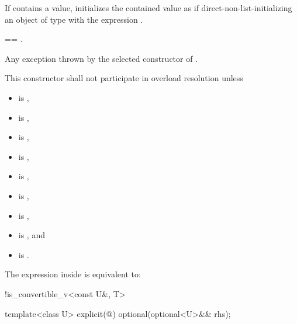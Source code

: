 \begin{itemdescr}
\pnum
\effects
If  contains a value,
initializes the contained value as if direct-non-list-initializing
an object of type  with the expression .

\pnum
\ensures
{} == .

\pnum
\throws
Any exception thrown by the selected constructor of .

\pnum
\remarks
This constructor shall not participate in overload resolution unless
\begin{itemize}
\item {} is ,
\item {} is ,
\item {} is ,
\item {} is ,
\item {} is ,
\item {} is ,
\item {} is ,
\item {} is , and
\item {} is .
\end{itemize}
The expression inside  is equivalent to:
\begin{codeblock}
!is_convertible_v<const U&, T>
\end{codeblock}
\end{itemdescr}

%
\begin{itemdecl}
template<class U> explicit(@\seebelow@) optional(optional<U>&& rhs);
\end{itemdecl}

